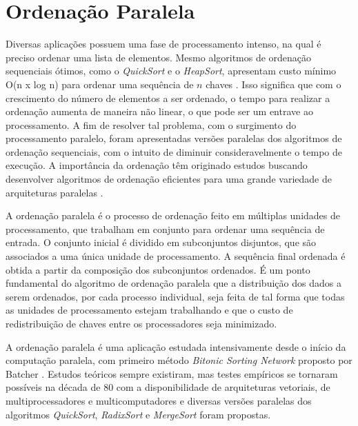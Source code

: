\section{Ordenação Paralela}


Diversas aplicações possuem uma fase de processamento intenso, na qual é preciso ordenar uma lista de elementos. Mesmo algoritmos de ordenação sequenciais ótimos, como o \textit{QuickSort} e o \textit{HeapSort}, apresentam custo mínimo O(n x log n) para ordenar uma sequência de $n$ chaves \cite{Cormen:2009}. 
Isso significa que com o crescimento do número de elementos a ser ordenado, o tempo para realizar a ordenação aumenta de maneira não linear, o que pode ser um entrave ao processamento. 
A fim de resolver tal problema, com o surgimento do processamento paralelo, foram apresentadas versões paralelas dos algoritmos de ordenação sequenciais, com o intuito de diminuir consideravelmente o tempo de execução. A importância da ordenação têm originado estudos buscando desenvolver algoritmos de ordenação eficientes para uma grande variedade de arquiteturas paralelas \cite{Akl:1990}.

 A ordenação paralela é o processo  de ordenação feito em múltiplas unidades de processamento, que trabalham em conjunto para ordenar uma sequência de entrada. O conjunto inicial é dividido em subconjuntos disjuntos, que são associados a uma única unidade de processamento. A sequência final ordenada é obtida a partir da composição dos subconjuntos ordenados. É um ponto fundamental do algoritmo de ordenação paralela que a distribuição dos dados a serem ordenados, por cada processo individual, seja feita de tal forma que todas as unidades de processamento estejam trabalhando e que o custo de redistribuição de chaves entre os processadores seja minimizado. 

A ordenação paralela é uma aplicação estudada intensivamente desde o início da computação paralela, com primeiro método \textit{Bitonic Sorting Network} proposto por Batcher \cite{Batcher:1968}. 
Estudos teóricos sempre existiram, mas testes empíricos se tornaram possíveis na década de 80 com a disponibilidade de arquiteturas vetoriais, de multiprocessadores e multicomputadores e diversas versões paralelas dos algoritmos \textit{QuickSort}, \textit{RadixSort} e \textit{MergeSort} foram propostas. 


